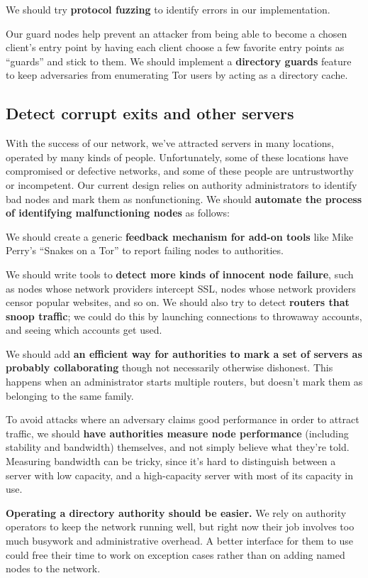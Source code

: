 \documentclass{article}
\begin{document}
We should try {\bf protocol fuzzing} to identify errors in our
implementation.

Our guard nodes help prevent an attacker from being able to become a chosen
client's entry point by having each client choose a few favorite entry points
as ``guards'' and stick to them.   We should implement a {\bf directory
  guards} feature to keep adversaries from enumerating Tor users by acting as
a directory cache.

\subsection{Detect corrupt exits and other servers}
With the success of our network, we've attracted servers in many locations,
operated by many kinds of people.  Unfortunately, some of these locations
have compromised or defective networks, and some of these people are
untrustworthy or incompetent.  Our current design relies on authority
administrators to identify bad nodes and mark them as nonfunctioning.  We
should {\bf automate the process of identifying malfunctioning nodes} as
follows:

We should create a generic {\bf feedback mechanism for add-on tools} like
Mike Perry's ``Snakes on a Tor'' to report failing nodes to authorities.

We should write tools to {\bf detect more kinds of innocent node failure},
such as nodes whose network providers intercept SSL, nodes whose network
providers censor popular websites, and so on.  We should also try to detect
{\bf routers that snoop traffic}; we could do this by launching connections
to throwaway accounts, and seeing which accounts get used.

We should add {\bf an efficient way for authorities to mark a set of servers
  as probably collaborating} though not necessarily otherwise dishonest.
This happens when an administrator starts multiple routers, but doesn't mark
them as belonging to the same family.

To avoid attacks where an adversary claims good performance in order to
attract traffic, we should {\bf have authorities measure node performance}
(including stability and bandwidth) themselves, and not simply believe what
they're told.  Measuring bandwidth can be tricky, since it's hard to
distinguish between a server with low capacity, and a high-capacity server
with most of its capacity in use.

{\bf Operating a directory authority should be easier.}  We rely on authority
operators to keep the network running well, but right now their job involves
too much busywork and administrative overhead.  A better interface for them
to use could free their time to work on exception cases rather than on
adding named nodes to the network.
\end{document}
